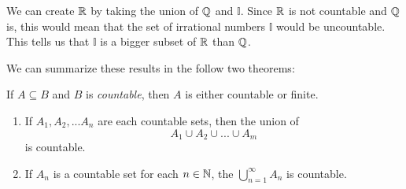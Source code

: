 We can create \( \mathbb{R} \) by taking the union of \( \mathbb{Q} \) and \( \mathbb{I} \). Since \( \mathbb{R} \) is not countable and \( \mathbb{Q} \) is, this would mean that the set of irrational numbers \( \mathbb{I}\) would be uncountable. This tells us that \( \mathbb{I}\) is a bigger subset of \( \mathbb{R} \) than \( \mathbb{Q} \). 

We can summarize these results in the follow two theorems: 


\begin{theorem}{}{}
    If \( A \subseteq B \) and \( B \) is \textit{countable}, then \( A \) is either countable or finite. 
\end{theorem}

\begin{theorem}{}{}
\begin{enumerate}
    \item If \( A_1, A_2,... A_n\) are each countable sets, then the union of 
        \[ A_1 \cup A_2 \cup ... \cup A_m \] is countable.
    \item If \( A_n \) is a countable set for each \( n \in \mathbb{N} \), the \( \bigcup_{n=1}^{\infty}A_n \) is countable. 
\end{enumerate}
\end{theorem}








